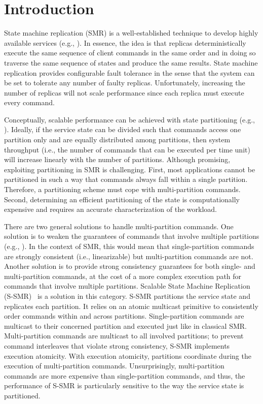 \section{Introduction}

State machine replication (SMR) is a well-established technique to develop highly available services (e.g., \cite{Shvachko:2003,Ghemawat:2003,Burrows:2006,MacCormick:2004}).
In essence, the idea is that replicas deterministically execute the same sequence of client commands in the same order and in doing so traverse the same sequence of states and produce the same results.
State machine replication provides configurable fault tolerance in the sense that the system can be set to tolerate any number of faulty replicas.
Unfortunately, increasing the number of replicas will not scale performance since each replica must execute every command.

Conceptually, scalable performance can be achieved with state partitioning (e.g., \cite{facebookTAO, sciascia2012sdur, Aguilera:2007}).
Ideally, if the service state can be divided such that commands access one partition only and are equally distributed among partitions, then system throughput (i.e., the number of commands that can be executed per time unit) will increase linearly with the number of partitions.
Although promising, exploiting partitioning in SMR is challenging.
First, most applications cannot be partitioned in such a way that commands always fall within a single partition.
Therefore, a partitioning scheme must cope with multi-partition commands.
Second, determining an efficient partitioning of the state is computationally expensive and requires an accurate characterization of the workload.

There are two general solutions to handle multi-partition commands.
One solution is to weaken the guarantees of commands that involve multiple partitions (e.g., \cite{facebookTAO}).
In the context of SMR, this would mean that single-partition commands are strongly consistent (i.e., linearizable) but multi-partition commands are not.
Another solution is to provide strong consistency guarantees for both single- and multi-partition commands, at the cost of a more complex execution path for commands that involve multiple partitions.
Scalable State Machine Replication (S-SMR)~\cite{bezerra2014ssmr} is a solution in this category.
S-SMR partitions the service state and replicates each partition.
It relies on an atomic multicast primitive to consistently order commands within and across partitions. 
Single-partition commands are multicast to their concerned partition and executed just like in classical SMR.
Multi-partition commands are multicast to all involved partitions; to prevent command interleaves that violate strong consistency, S-SMR implements execution atomicity.
With execution atomicity, partitions coordinate during the execution of multi-partition commands.
Unsurprisingly, multi-partition commands are more expensive than single-partition commands, and thus, the performance of S-SMR is particularly sensitive to the way the service state is partitioned.

